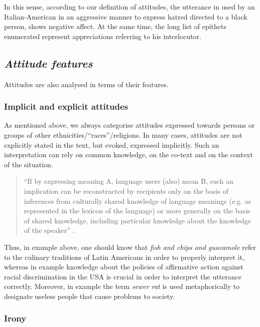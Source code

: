 \documentclass[output=paper]{LSP/langsci}
\begin{document}
In this sense, according to our definition of attitudes, the utterance in  used by an Italian-American in an aggressive manner to express hatred directed to a black person, shows negative affect. At the same time, the long list of epithets enumerated represent appreciations referring to his interlocutor.

\subsection{\textit{Attitude features}} \label{sec:2:4:3}

Attitudes are also analysed in terms of their features.

\subsubsection{Implicit and explicit attitudes} 

As mentioned above, we always categorise attitudes expressed towards persons or groups of other ethnicities/“races”/religions. In many cases, attitudes are not explicitly stated in the text, but evoked, expressed implicitly. Such an interpretation can rely on common knowledge, on the co-text and on the context of the situation.

\begin{quote}
“If by expressing meaning A, language users (also) mean B, such an implication can be reconstructed by recipients only on the basis of inferences from culturally shared knowledge of language meanings (e.g. as represented in the lexicon of the language) or more generally on the basis of shared knowledge, including particular knowledge about the knowledge of the speaker” \citep[168]{Dijk1995}.
\end{quote}

Thus, in example  above, one should know that \textit{fish and chips and guacamole} refer to the culinary traditions of Latin Americans in order to properly interpret it, whereas in example  knowledge about the policies of affirmative action against racial discrimination in the USA is crucial in order to interpret the utterance correctly. Moreover, in example  the term \textit{sewer rat} is used metaphorically to designate useless people that cause problems to society.

\subsubsection{Irony}
\end{document}
